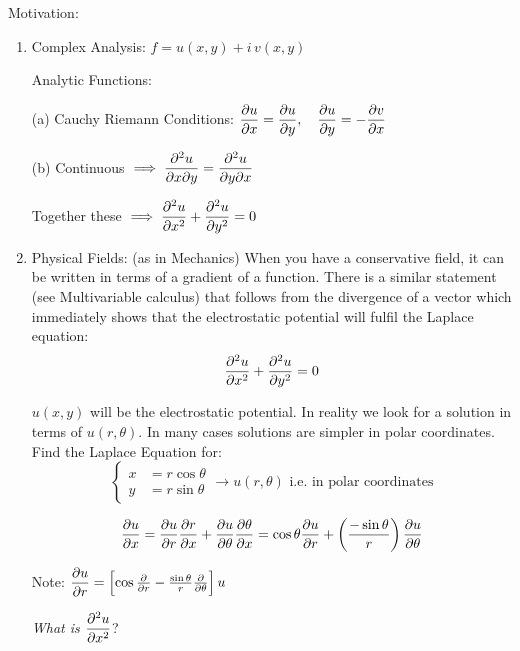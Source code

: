 \documentclass[10pt]{scrartcl}
\begin{document}
Motivation: 
\begin{enumerate}
\item Complex Analysis: $f = u(x,y) + i\,v(x,y)$

Analytic Functions:

(a) Cauchy Riemann Conditions:
$\dfrac{\partial u}{\partial x} = \dfrac{\partial u}{\partial y}, \quad \dfrac{\partial u}{\partial y} = -\dfrac{\partial v}{\partial x}$

(b) Continuous $\implies \dfrac{\partial^2u}{\partial x\partial y} = \dfrac{\partial^2u}{\partial y\partial x}$

Together these $\implies \dfrac{\partial^2u}{\partial x^2} + \dfrac{\partial^2u}{\partial y^2} = 0$\\

\item Physical Fields: 
(as in Mechanics) When you have a conservative field, it can be written in terms of a gradient of a function. There is a similar statement (see Multivariable calculus) that follows from the divergence of a vector which immediately shows that the electrostatic potential will fulfil the Laplace equation: 
\[\dfrac{\partial^2u}{\partial x^2} + \dfrac{\partial^2u}{\partial y^2} = 0\]

$u(x,y)$ will be the electrostatic potential. In reality we look for a solution in terms of $u(r,\theta)$. In many cases solutions are simpler in polar coordinates. Find the Laplace Equation for: 
\[\begin{cases} 
x &= r\cos\theta\\
y &= r\sin\theta 	
\end{cases}\longrightarrow u(r,\theta) \text{ i.e. in polar coordinates}
\]

\[\frac{\partial u}{\partial x} = \frac{\partial u}{\partial r}\frac{\partial r}{\partial x} + \frac{\partial u}{\partial \theta}\frac{\partial \theta}{\partial x} = \cos\theta \frac{\partial u}{\partial r} + \left(\frac{-\sin\theta}{r}\right)\frac{\partial u}{\partial \theta}\]

Note: $\dfrac{\partial u}{\partial r} = \left[\cos\frac{\partial}{\partial r} - \frac{\sin\theta}{r}\frac{\partial}{\partial \theta}\right]u$

\emph{What is $\dfrac{\partial^2u}{\partial x^2}$}?
\setlength{\jot}{8pt}


\end{enumerate}
\end{document}
